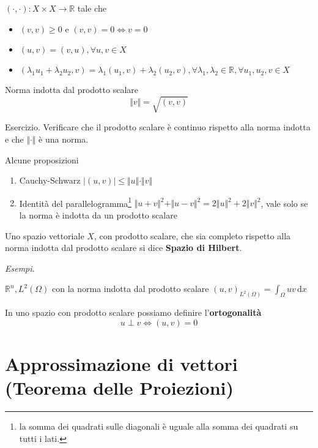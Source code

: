 \documentclass[10pt,a4paper,twoside,openright]{book}
\newcommand{\de}{\,\mathrm d}
\newcommand{\dx}{\de x}
\begin{document}
\begin{definition}
     $(\cdotp,\cdotp) :X\times X\rightarrow \mathbb{R}$ tale che
    \begin{itemize}
        \item $(v,v) \geqslant 0$ e $(v,v) =0\Leftrightarrow v=0$
        \item $(u,v) =(v,u),\forall u,v\in X$
        \item $(\lambda _{1} u_{1} +\lambda _{2} u_{2},v) =\lambda _{1}(u_{1},v) +\lambda _{2}(u_{2},v),\forall \lambda _{1},\lambda _{2} \in \mathbb{R},\forall u_{1},u_{2},v\in X$
    \end{itemize}
\end{definition}
\begin{definition}
    Norma indotta dal prodotto scalare
    \begin{equation*}
        \Vert v\Vert =\sqrt{(v,v)}
    \end{equation*}
\end{definition}
Esercizio. Verificare che il prodotto scalare è continuo rispetto alla norma indotta e che $\Vert \cdotp \Vert $ è una norma.
\begin{theorem}
    Alcune proposizioni
    \begin{enumerate}
        \item Cauchy-Schwarz $| (u,v)| \leqslant \Vert u\Vert \cdotp \Vert v\Vert $
        \item Identità del parallelogramma\footnote{la somma dei quadrati sulle diagonali è uguale alla somma dei quadrati su tutti i lati.} $\Vert u+v\Vert ^{2} +\Vert u-v\Vert ^{2} =2\Vert u\Vert ^{2} +2\Vert v\Vert ^{2}$, vale solo se la norma è indotta da un prodotto scalare
    \end{enumerate}
\end{theorem}
\begin{definition}
    Uno spazio vettoriale $X$, con prodotto scalare, che sia completo rispetto alla norma indotta dal prodotto scalare si dice \textbf{Spazio di Hilbert}.
\end{definition}
\textit{Esempi.}

$\mathbb{R}^{n},L^{2}(\Omega)$ con la norma indotta dal prodotto scalare $(u,v)_{L^{2}(\Omega)} =\int _{\Omega } uv\dx$

In uno spazio con prodotto scalare possiamo definire l'\textbf{ortogonalità}
\begin{equation*}
    u\perp v\Leftrightarrow (u,v) =0
\end{equation*}
\section{Approssimazione di vettori (Teorema delle Proiezioni)}
\end{document}
